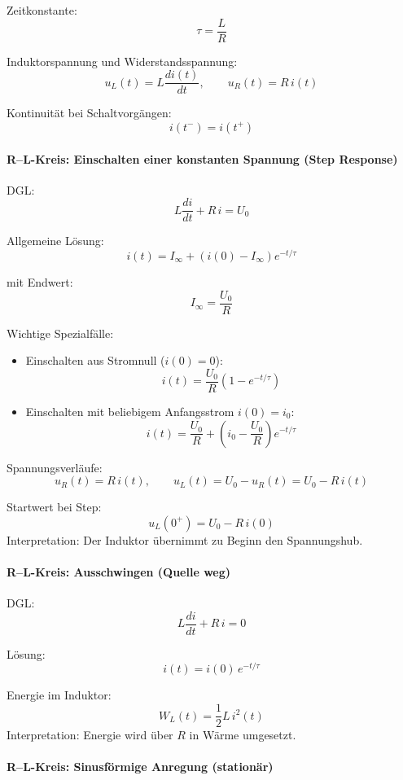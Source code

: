 Zeitkonstante:
\[
\boxed{\tau=\frac{L}{R}}
\]

Induktorspannung und Widerstandsspannung:
\[
\boxed{u_L(t)=L\frac{di(t)}{dt}},\qquad \boxed{u_R(t)=R\,i(t)}
\]

Kontinuität bei Schaltvorgängen:
\[
\boxed{i(t^-)=i(t^+)}
\]


\paragraph{R--L-Kreis: Einschalten einer konstanten Spannung (Step Response)}

DGL:
\[
L\frac{di}{dt}+R\,i=U_0
\]

Allgemeine Lösung:
\[
\boxed{
i(t)=I_\infty + \left(i(0)-I_\infty\right)e^{-t/\tau}
}
\]

mit Endwert:
\[
\boxed{I_\infty=\frac{U_0}{R}}
\]

Wichtige Spezialfälle:
\begin{itemize}
\item Einschalten aus Stromnull ($i(0)=0$):
\[
\boxed{i(t)=\frac{U_0}{R}\left(1-e^{-t/\tau}\right)}
\]
\item Einschalten mit beliebigem Anfangsstrom $i(0)=i_0$:
\[
\boxed{i(t)=\frac{U_0}{R}+\left(i_0-\frac{U_0}{R}\right)e^{-t/\tau}}
\]
\end{itemize}

Spannungsverläufe:
\[
\boxed{u_R(t)=R\,i(t)},\qquad 
\boxed{u_L(t)=U_0-u_R(t)=U_0-R\,i(t)}
\]

Startwert bei Step:
\[
\boxed{u_L(0^+)=U_0-R\,i(0)}
\]
Interpretation: Der Induktor übernimmt zu Beginn den Spannungshub.


\paragraph{R--L-Kreis: Ausschwingen (Quelle weg)}

DGL:
\[
L\frac{di}{dt}+R\,i=0
\]

Lösung:
\[
\boxed{i(t)=i(0)\,e^{-t/\tau}}
\]

Energie im Induktor:
\[
\boxed{W_L(t)=\frac{1}{2}L\,i^2(t)}
\]
Interpretation: Energie wird über $R$ in Wärme umgesetzt.


\paragraph{R--L-Kreis: Sinusförmige Anregung (stationär)}

